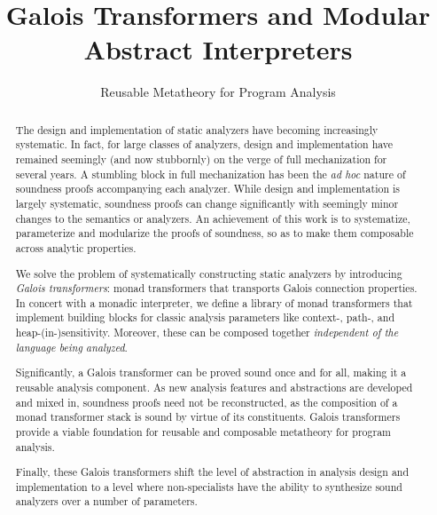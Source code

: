 \documentclass[pldi,nocopyrightspace]{sigplanconf}
\begin{document}
\setlength{\abovedisplayskip}{0em}
\setlength{\belowdisplayskip}{0em}
\setlength{\abovedisplayshortskip}{0em}
\setlength{\belowdisplayshortskip}{0em}

\title{Galois Transformers and Modular Abstract Interpreters}
\subtitle{Reusable Metatheory for Program Analysis}
\maketitle

\begin{abstract}

The design and implementation of static analyzers have becoming increasingly
systematic.  In fact, for large classes of analyzers, design and implementation
have remained seemingly (and now stubbornly) on the verge of full mechanization
for several years.  A stumbling block in full mechanization has been the
\emph{ad hoc} nature of soundness proofs accompanying each analyzer. While
design and implementation is largely systematic, soundness proofs can change
significantly with seemingly minor changes to the semantics or analyzers.  An
achievement of this work is to systematize, parameterize and modularize the
proofs of soundness, so as to make them composable across analytic properties.

\par 

We solve the problem of systematically constructing static analyzers by
introducing \emph{Galois transformers}: monad transformers that
transports Galois connection properties.  In concert with a monadic
interpreter, we define a library of monad transformers that
implement building blocks for classic analysis parameters like context-, path-,
and heap-(in-)sensitivity. Moreover, these can be composed together 
\emph{independent of the language being analyzed}.

\par 

Significantly, a Galois transformer can be proved sound once and for all,
making it a reusable analysis component.  As new analysis features and
abstractions are developed and mixed in, soundness proofs need not be
reconstructed, as the composition of a monad transformer stack is sound by
virtue of its constituents.  Galois transformers provide a viable foundation
for reusable and composable metatheory for program analysis.

\par 

Finally, these Galois transformers shift the level of abstraction in analysis
design and implementation to a level where non-specialists have the ability to
synthesize sound analyzers over a number of parameters.

\end{abstract}



\balance


\end{document}
